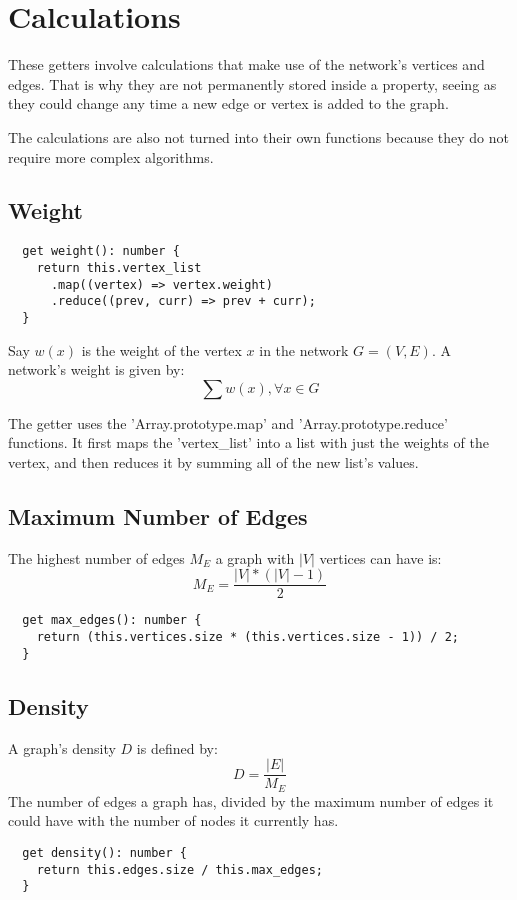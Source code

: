 \section{Calculations}

These getters involve calculations that make use of the network's vertices and edges. That is why they are not permanently stored inside a property, seeing as they could change any time a new edge or vertex is added to the graph.

The calculations are also not turned into their own functions because they do not require more complex algorithms.

\subsection{Weight}

\begin{verbatim}
  get weight(): number {
    return this.vertex_list
      .map((vertex) => vertex.weight)
      .reduce((prev, curr) => prev + curr);
  }
\end{verbatim}

Say $w(x)$ is the weight of the vertex $x$ in the network $G=(V,E)$. A network's weight is given by:
$$\sum{w(x)}, \forall x \in G$$

The getter uses the 'Array.prototype.map' and 'Array.prototype.reduce' functions.
It first maps the 'vertex\_list' into a list with just the weights of the vertex, and then reduces it by summing all of the new list's values.

\subsection{Maximum Number of Edges}
The highest number of edges $M_E$ a graph with $|V|$ vertices can have is:
$$M_E=\frac{|V|*(|V|-1)}{2}$$

\begin{verbatim}
  get max_edges(): number {
    return (this.vertices.size * (this.vertices.size - 1)) / 2;
  }
\end{verbatim}

\subsection{Density}

A graph's density $D$ is defined by:
$$D=\frac{|E|}{M_E}$$
The number of edges a graph has, divided by the maximum number of edges it could have with the number of nodes it currently has.

\begin{verbatim}
  get density(): number {
    return this.edges.size / this.max_edges;
  }
\end{verbatim}